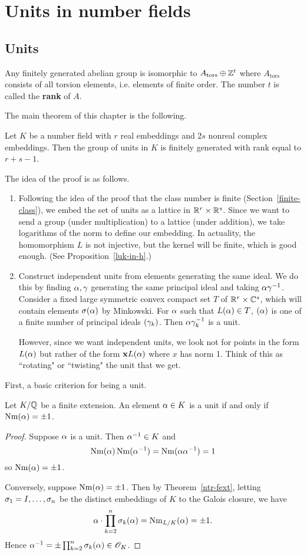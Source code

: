 \chapter{Units in number fields}
\section{Units}
Any finitely generated abelian group is isomorphic to $A_{\text{tors}}\oplus \mathbb{Z}^t$ where $A_{\text{tors}}$ consists of all torsion elements, i.e. elements of finite order. The number $t$ is called the \textbf{rank} of $A$.

The main theorem of this chapter is the following.
\begin{thm}
Let $K$ be a number field with $r$ real embeddings and $2s$ nonreal complex embeddings. Then
the group of units in $K$ is finitely generated with rank equal to $r+s-1$.
\end{thm}
The idea of the proof is as follows.
\begin{enumerate}
\item Following the idea of the proof that the class number is finite (Section~\ref{finite-class}), we embed the set of units as a lattice in $\mathbb{R}^r\times \mathbb{R}^s$. Since we want to send a group (under multiplication) to a lattice (under addition), we take logarithms of the norm to define our embedding. In actuality, the homomorphism $L$ is not injective, but the kernel will be finite, which is good enough. (See  Proposition~\ref{luk-in-h}.)
\item Construct independent units from elements generating the same ideal. We do this by finding $\alpha,\gamma$ generating the same principal ideal and taking $\alpha\gamma^{-1}$.
Consider a fixed large symmetric convex compact set $T$ of $\mathbb{R}^{r}\times \mathbb{C}^s$, which will contain elements $\sigma(\alpha)$ by Minkowski. For $\alpha$ such that $L(\alpha)\in T$, $(\alpha)$ is one of a finite number of principal ideals $(\gamma_k)$. Then $\alpha\gamma_k^{-1}$ is a unit.

However, since we want independent units, we look not for points in the form $L(\alpha)$ but rather of the form $\mathbf xL(\alpha)$ where $x$ has norm 1. Think of this as ``rotating" or ``twisting" the unit that we get.
\end{enumerate}

First, a basic criterion for being a unit.
\begin{pr}
Let $K/\mathbb{Q}$ be a finite extension. 
An element $\alpha\in K$ is a unit if and only if $\operatorname{Nm}(\alpha)=\pm 1$.
\end{pr}
\begin{proof}
Suppose $\alpha$ is a unit. Then $\alpha^{-1}\in K$ and
\[
\nm(\al)\nm(\al^{-1})=\nm(\al\al^{-1})%
=1
\]
so $\operatorname{Nm}(\alpha)=\pm1$.

Conversely, suppose $\operatorname{Nm}(\alpha)=\pm 1$. Then by Theorem~\ref{ntr-fext}, letting $\sigma_1=I,\ldots,\sigma_n$ be the distinct embeddings of $K$ to the Galois closure, we have
\[
\alpha\cdot \prod_{k=2}^n \sigma_k(\alpha)=\operatorname{Nm}_{L/K}(\alpha)=\pm1.
\]
Hence $\alpha^{-1}=\pm \prod_{k=2}^n \sigma_k(\alpha)\in \mathscr{O}_K$. 
\end{proof}
